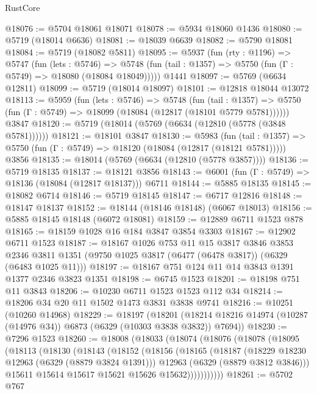 \begin{lexlean}{RustCore}
\begin{coremodule}
@18076 := @5704 @18061 @18071
@18078 := @5934 @18060 @1436
@18080 := @5719 (@18014 @6636)
@18081 := @18039 @6639
@18082 := @5790 @18081
@18084 := @5719 (@18082 @5811)
@18095 := @5937
    (fun (rty : @1196) =>
    @5747
      (fun (lets : @5746) =>
      @5748 (fun (tail : @1357) => @5750 (fun (Γ : @5749) => @18080 (@18084 @18049)))))
    @1441
@18097 := @5769 (@6634 @12811)
@18099 := @5719 (@18014 @18097)
@18101 := @12818 @18044 @13072
@18113 := @5959
    (fun (lets : @5746) =>
    @5748
      (fun (tail : @1357) =>
      @5750 (fun (Γ : @5749) => @18099 (@18084 (@12817 (@18101 @5779 @5781))))))
    @3847
@18120 := @5719 (@18014 (@5769 (@6634 (@12810 (@5778 (@3848 @5781))))))
@18121 := @18101 @3847
@18130 := @5983
    (fun (tail : @1357) => @5750 (fun (Γ : @5749) => @18120 (@18084 (@12817 (@18121 @5781)))))
    @3856
@18135 := @18014 (@5769 (@6634 (@12810 (@5778 @3857))))
@18136 := @5719 @18135
@18137 := @18121 @3856
@18143 := @6001 (fun (Γ : @5749) => @18136 (@18084 (@12817 @18137))) @6711
@18144 := @5885 @18135
@18145 := @18082 @6714
@18146 := @5719 @18145
@18147 := @6717 @12816
@18148 := @18147 @18137
@18152 := @18144 (@18146 @18148) (@6067 @18013)
@18156 := @5885 @18145 @18148 (@6072 @18081)
@18159 := @12889 @6711 @1523 @878
@18165 := @18159 @1028 @16 @184 @3847 @3854 @3303
@18167 := @12902 @6711 @1523
@18187 := @18167
    @1026
    @753
    @11
    @15
    @3817
    @3846
    @3853
    @2346
    @3811
    @1351
    (@9750 @1025 @3817 (@6477 (@6478 @3817)) (@6329 (@6483 @1025 @11)))
@18197 := @18167 @751 @124 @11 @14 @3843 @1391 @1377 @2346 @3823 @1351
@18198 := @6745 @1523
@18201 := @18198 @751 @11 @3843
@18206 := @10230 @6711 @1523 @1523 @112 @34
@18214 := @18206 @34 @20 @11 @1502 @1473 @3831 @3838 @9741
@18216 := @10251 (@10260 @14968)
@18229 := @18197
    (@18201 (@18214 @18216 @14974 (@10287 (@14976 @34)) @6873 (@6329 (@10303 @3838 @3832)) @7694))
@18230 := @7296 @1523
@18260 := @18008
    (@18033
      (@18074
        (@18076
          (@18078
            (@18095
              (@18113
                (@18130
                  (@18143
                    (@18152
                      (@18156
                        (@18165
                          (@18187
                            (@18229 @18230 @12963 (@6329 (@8879 @3824 @1391)))
                            @12963
                            (@6329 (@8879 @3812 @3846)))
                          @15611
                          @15614
                          @15617
                          @15621
                          @15626
                          @15632)))))))))))
@18261 := @5702 @767

\end{coremodule}
\end{lexlean}
